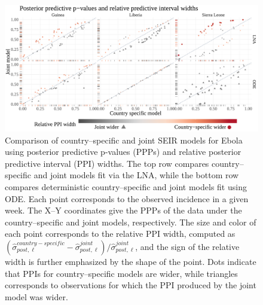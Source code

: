 \begin{figure}[htbp]
	\centering
	\includegraphics[width=0.85\linewidth]{figures/ebola_single_joint_ppicomp}
	\caption[Comparison of country--specific and joint SEIR Ebola models with posterior predictive p-values and relative predictive interval widths.]{Comparison of country--specific and joint SEIR models for Ebola using posterior predictive p-values (PPPs) and relative posterior predictive interval (PPI) widths. The top row compares country--specific and joint models fit via the LNA, while the bottom row compares deterministic country--specific and joint models fit using ODE. Each point corresponds to the observed incidence in a given week. The X--Y coordinates give the PPPs of the data under the country--specific and joint models, respectively. The size and color of each point corresponds to the relative PPI width, computed as $ (\widehat{\sigma}_{post,\ell}^{country-specific} - \widehat{\sigma}_{post,\ell}^{joint})/\widehat{\sigma}_{post,\ell}^{joint} $, and the sign of the relative width is further emphasized by the shape of the point. Dots indicate that PPIs for country--specific models are wider, while triangles corresponds to observations for which the PPI produced by the joint model was wider.}
	\label{fig:ebola_single_joint_ppicomp}
\end{figure}

